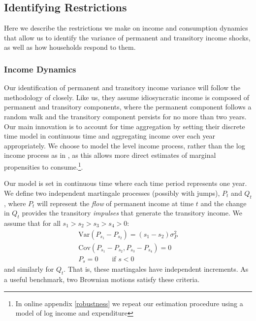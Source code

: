 \documentclass[titlepage]{\econtex}\newcommand{\texname}{ConsumptionHeterogeneity}
\begin{document}
\subsection{Identifying Restrictions} \label{cov_restrictions}

Here we describe the restrictions we make on income and consumption dynamics that allow us to identify the variance of permanent and transitory income shocks, as well as how households respond to them. 

\subsubsection{Income Dynamics}
Our identification of permanent and transitory income variance will follow the methodology of \cite{carroll_nature_1997} closely. Like us, they assume idiosyncratic income is composed of permanent and transitory components, where the permanent component follows a random walk and the transitory component persists for no more than two years. Our main innovation is to account for time aggregation by setting their discrete time model in continuous time and aggregating income over each year appropriately. We choose to model the level income process, rather than the log income process as in \cite{carroll_nature_1997}, as this allows more direct estimates of marginal propensities to consume.\footnote{In online appendix \ref{robustness} we repeat our estimation procedure using a model of log income and expenditure}.

Our model is set in continuous time where each time period represents one year. We define two independent martingale processes (possibly with jumps), $P_t$ and $Q_t$, where $P_t$ will represent the \textit{flow} of permanent income at time $t$ and the change in $Q_t$ provides the transitory \textit{impulses} that generate the transitory income. We assume that for all  $s_1>s_2>s_3>s_4>0$:
\begin{align*}
\mathrm{Var}(P_{s_1}-P_{s_2})=(s_1-s_2)\sigma_P^2 \\
\mathrm{Cov}(P_{s_1}-P_{s_2},P_{s_3}-P_{s_4}) = 0 \\
P_s = 0 \qquad \text{if } s<0
\end{align*}
and similarly for $Q_t$. That is, these martingales have independent increments. As a useful benchmark, two Brownian motions satisfy these criteria.
\end{document}
